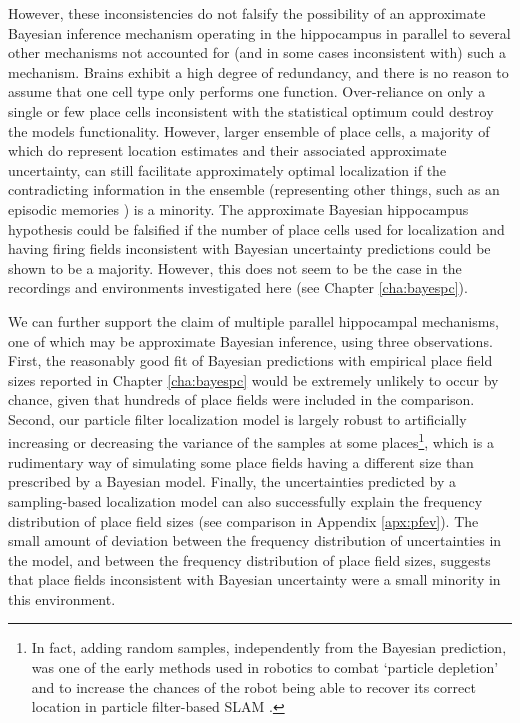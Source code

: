 However, these inconsistencies do not falsify the possibility of an approximate Bayesian inference mechanism operating in the hippocampus in parallel to several other mechanisms not accounted for (and in some cases inconsistent with) such a mechanism. Brains exhibit a high degree of redundancy, and there is no reason to assume that one cell type only performs one function. Over-reliance on only a single or few place cells inconsistent with the statistical optimum could destroy the models functionality. However, larger ensemble of place cells, a majority of which do represent location estimates and their associated approximate uncertainty, can still facilitate approximately optimal localization if the contradicting information in the ensemble (representing other things, such as an episodic memories \citep{tulving1998episodic}) is a minority. The approximate Bayesian hippocampus hypothesis could be falsified if the number of place cells used for localization and having firing fields inconsistent with Bayesian uncertainty predictions could be shown to be a majority. However, this does not seem to be the case in the recordings and environments investigated here (see Chapter \ref{cha:bayespc}).

We can further support the claim of multiple parallel hippocampal mechanisms, one of which may be approximate Bayesian inference, using three observations. First, the reasonably good fit of Bayesian predictions with empirical place field sizes reported in Chapter \ref{cha:bayespc} would be extremely unlikely to occur by chance, given that hundreds of place fields were included in the comparison. Second, our particle filter localization model is largely robust to artificially increasing or decreasing the variance of the samples at some places\footnote{In fact, adding random samples, independently from the Bayesian prediction, was one of the early methods used in robotics to combat `particle depletion' and to increase the chances of the robot being able to recover its correct location in particle filter-based SLAM \citep{thrun2005probabilistic}.}, which is a rudimentary way of simulating some place fields having a different size than prescribed by a Bayesian model. Finally, the uncertainties predicted by a sampling-based localization model can also successfully explain the frequency distribution of place field sizes (see comparison in Appendix \ref{apx:pfev}). The small amount of deviation between the frequency distribution of uncertainties in the model, and between the frequency distribution of place field sizes, suggests that place fields inconsistent with Bayesian uncertainty were a small minority in this environment. 


